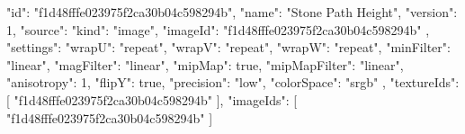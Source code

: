 {
  "id": "f1d48fffe023975f2ca30b04c598294b",
  "name": "Stone Path Height",
  "version": 1,
  "source": {
    "kind": "image",
    "imageId": "f1d48fffe023975f2ca30b04c598294b"
  },
  "settings": {
    "wrapU": "repeat",
    "wrapV": "repeat",
    "wrapW": "repeat",
    "minFilter": "linear",
    "magFilter": "linear",
    "mipMap": true,
    "mipMapFilter": "linear",
    "anisotropy": 1,
    "flipY": true,
    "precision": "low",
    "colorSpace": "srgb"
  },
  "textureIds": [
    "f1d48fffe023975f2ca30b04c598294b"
  ],
  "imageIds": [
    "f1d48fffe023975f2ca30b04c598294b"
  ]
}
